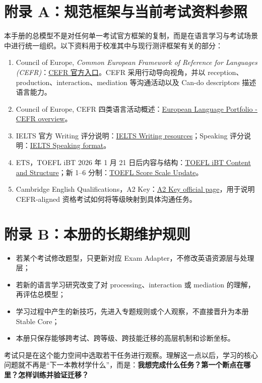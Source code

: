 \documentclass[11pt,a4paper]{ctexart}
\newcommand{\kw}[1]{\textbf{#1}}
\begin{document}
\section{附录 A：规范框架与当前考试资料参照}
本手册的总模型不是对任何单一考试官方框架的复制，而是在语言学习与考试场景中进行统一组织。以下资料用于校准其中与现行测评框架有关的部分：
\begin{enumerate}
  \item Council of Europe, \textit{Common European Framework of Reference for Languages (CEFR)}：\href{https://www.coe.int/en/web/common-european-framework-reference-languages/home}{CEFR 官方入口}。CEFR 采用行动导向视角，并以 reception、production、interaction、mediation 等沟通活动以及 Can-do descriptors 描述语言能力。
  \item Council of Europe, CEFR 四类语言活动概述：\href{https://www.coe.int/en/web/portfolio/the-common-european-framework-of-reference-for-languages-learning-teaching-assessment-cefr-}{European Language Portfolio - CEFR overview}。
  \item IELTS 官方 Writing 评分说明：\href{https://ielts.org/take-a-test/preparation-resources/writing-test-resources}{IELTS Writing resources}；Speaking 评分说明：\href{https://ielts.org/take-a-test/test-types/ielts-academic-test/ielts-academic-format-speaking}{IELTS Speaking format}。
  \item ETS，TOEFL iBT 2026 年 1 月 21 日后内容与结构：\href{https://www.ets.org/toefl/institutions/ibt/about/content-structure.html}{TOEFL iBT Content and Structure}；新 1--6 分制：\href{https://www.ets.org/toefl/institutions/ibt/score-scale-update.html}{TOEFL Score Scale Update}。
  \item Cambridge English Qualifications，A2 Key：\href{https://www.cambridgeenglish.org/exams-and-tests/qualifications/key/}{A2 Key official page}，用于说明 CEFR-aligned 资格考试如何将等级映射到具体沟通任务。
\end{enumerate}

\section{附录 B：本册的长期维护规则}
\begin{itemize}
  \item 若某个考试修改题型，只更新对应 Exam Adapter，不修改英语资源层与处理层；
  \item 若新的语言学习研究改变了对 processing、interaction 或 mediation 的理解，再评估总模型；
  \item 学习过程中产生的新技巧，先进入专题规则或个人观察，不直接晋升为本册 Stable Core；
  \item 本册只保存能够跨考试、跨等级、跨技能迁移的高层机制和诊断坐标。
\end{itemize}

\begin{corebox}[最终定义]
\begin{center}
\end{center}
考试只是在这个能力空间中选取若干任务进行观察。理解这一点以后，学习的核心问题就不再是“下一本教材学什么”，而是：\kw{我想完成什么任务？第一个断点在哪里？怎样训练并验证迁移？}
\end{corebox}
\end{document}
